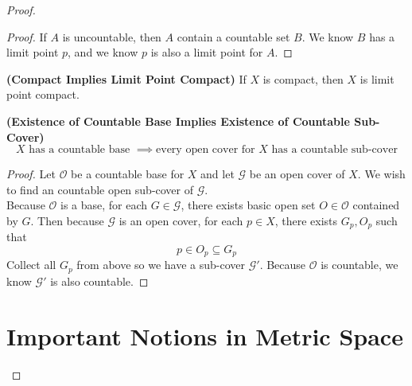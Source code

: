 \documentclass{report}
\begin{document}
\begin{proof}
\begin{proof}
If $A$ is uncountable, then  $A$ contain a countable set  $B$. We know  $B$ has a limit point  $p$, and we know  $p$ is also a limit point for $A$.
\end{proof}
\begin{corollary}
\label{2.6.8}
\textbf{(Compact Implies Limit Point Compact)} If $X$ is compact, then $X$ is limit point compact.
\end{corollary}
\begin{theorem}
\label{2.6.9}
\textbf{(Existence of Countable Base Implies Existence of Countable Sub-Cover)} 
\begin{equation}
X\text{ has a countable base }\implies\text{every open cover for $X$ has a countable sub-cover}
\end{equation}
\end{theorem}
\begin{proof}
Let $\mathcal{O}$ be a countable base for $X$ and let $\mathcal{G}$ be an open cover of $X$. We wish to find an countable open sub-cover of $\mathcal{G}$.\\

Because $\mathcal{O}$ is a base, for each $G\in \mathcal{G}$, there exists basic open set $O\in \mathcal{O}$ contained by $G$. Then because  $\mathcal{G}$ is an open cover, for each $p\in X$, there exists $G_p,O_p$ such that
\begin{equation}
p\in O_p\subseteq G_p
\end{equation}
Collect all $G_p$ from above so we have a sub-cover $\mathcal{G}'$. Because $\mathcal{O}$ is countable, we know $\mathcal{G}'$ is also countable.
\end{proof}
\chapter{Important Notions in Metric Space}

\end{proof}
\end{document}
